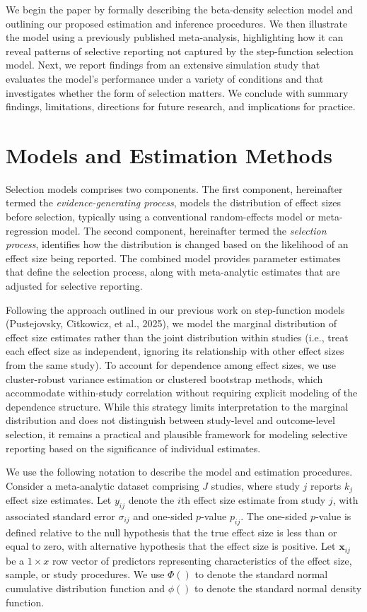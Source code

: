 \documentclass[
  man, donotrepeattitle,floatsintext]{apa7}
\begin{document}
We begin the paper by formally describing the beta-density selection model and outlining our proposed estimation and inference procedures. We then illustrate the model using a previously published meta-analysis, highlighting how it can reveal patterns of selective reporting not captured by the step-function selection model. Next, we report findings from an extensive simulation study that evaluates the model's performance under a variety of conditions and that investigates whether the form of selection matters. We conclude with summary findings, limitations, directions for future research, and implications for practice.

\section{Models and Estimation Methods}\label{model-and-estimation}

Selection models comprises two components. The first component, hereinafter termed the \emph{evidence-generating process}, models the distribution of effect sizes before selection, typically using a conventional random-effects model or meta-regression model. The second component, hereinafter termed the \emph{selection process}, identifies how the distribution is changed based on the likelihood of an effect size being reported. The combined model provides parameter estimates that define the selection process, along with meta-analytic estimates that are adjusted for selective reporting.

Following the approach outlined in our previous work on step-function models (Pustejovsky, Citkowicz, et al., 2025), we model the marginal distribution of effect size estimates rather than the joint distribution within studies (i.e., treat each effect size as independent, ignoring its relationship with other effect sizes from the same study). To account for dependence among effect sizes, we use cluster-robust variance estimation or clustered bootstrap methods, which accommodate within-study correlation without requiring explicit modeling of the dependence structure. While this strategy limits interpretation to the marginal distribution and does not distinguish between study-level and outcome-level selection, it remains a practical and plausible framework for modeling selective reporting based on the significance of individual estimates.

We use the following notation to describe the model and estimation procedures. Consider a meta-analytic dataset comprising \(J\) studies, where study \(j\) reports \(k_j\) effect size estimates. Let \(y_{ij}\) denote the \(i\)th effect size estimate from study \(j\), with associated standard error \(\sigma_{ij}\) and one-sided \(p\)-value \(p_{ij}\). The one-sided \(p\)-value is defined relative to the null hypothesis that the true effect size is less than or equal to zero, with alternative hypothesis that the effect size is positive. Let \(\mathbf{x}_{ij}\) be a \(1 \times x\) row vector of predictors representing characteristics of the effect size, sample, or study procedures. We use \(\Phi()\) to denote the standard normal cumulative distribution function and \(\phi()\) to denote the standard normal density function.
\end{document}
